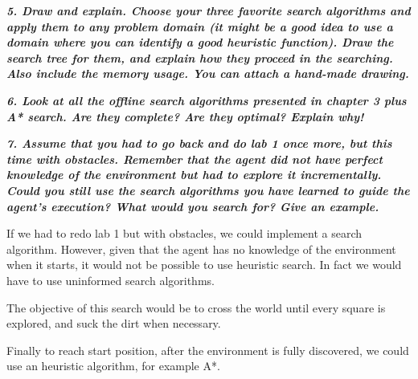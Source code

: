 \textit{\textbf{5. Draw and explain. Choose your three favorite search algorithms and apply them to any problem domain (it might be a good idea to use a domain where you can identify a good heuristic function). Draw the search tree for them, and explain how they proceed in the searching. Also include the memory usage. You can attach a hand-made drawing.}}

\textit{\textbf{6. Look at all the offline search algorithms presented in chapter 3 plus A* search. Are they complete? Are they optimal? Explain why!}}

\textit{\textbf{7. Assume that you had to go back and do lab 1 once more, but this time with obstacles. Remember that the agent did not have perfect knowledge of the environment but had to explore it incrementally. Could you still use the search algorithms you have learned to guide the agent's execution? What would you search for? Give an example.}}

If we had to redo lab 1 but with obstacles, we could implement a search algorithm.
However, given that the agent has no knowledge of the environment when it starts,
it would not be possible to use heuristic search. In fact we would have to use
uninformed search algorithms.

The objective of this search would be to cross the world until every square is explored,
and suck the dirt when necessary.

Finally to reach start position, after the environment is fully discovered,
we could use an heuristic algorithm, for example A*.
